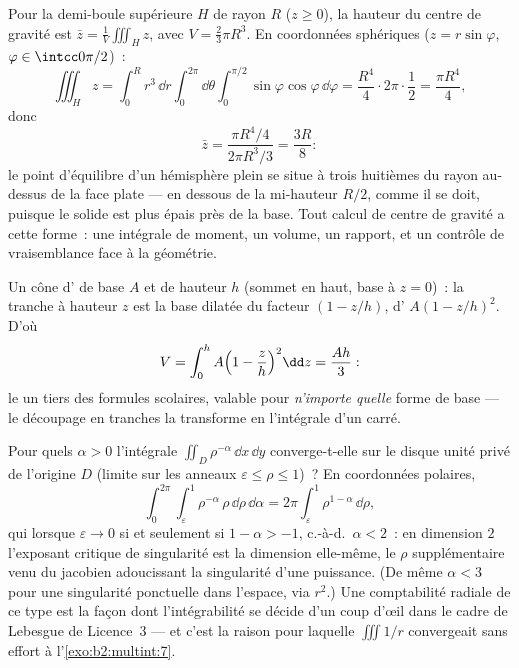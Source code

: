 \begin{example}\label{ex:b2:multint:centroid}
Pour la demi-boule supérieure $H$ de rayon $R$ ($z \geq 0$), la
hauteur du centre de gravité est $\bar z = \frac1{V}\iiint_H z$, avec
$V = \frac23\pi R^3$. En coordonnées sphériques ($z =
r\sin\varphi$, $\varphi \in \intcc0{\pi/2}$)~:
\[
\iiint_H z
= \int_0^R r^3\,\dd r\int_0^{2\pi}\dd\theta
\int_0^{\pi/2}\sin\varphi\cos\varphi\,\dd\varphi
= \frac{R^4}4\cdot2\pi\cdot\frac12 = \frac{\pi R^4}4 ,
\]
donc
\[
\bar z = \frac{\pi R^4/4}{2\pi R^3/3} = \frac{3R}8 :
\]
le point d'équilibre d'un hémisphère plein se situe à trois huitièmes
du rayon au-dessus de la face plate --- en dessous de la mi-hauteur
$R/2$, comme il se doit, puisque le solide est plus épais près de la
base. Tout calcul de centre de gravité a cette forme~: une intégrale
de moment, un volume, un rapport, et un contrôle de vraisemblance
face à la géométrie.
\end{example}

\begin{example}\label{ex:b2:multint:cone}
Un cône d' de base $A$ et de hauteur $h$ (sommet en haut, base à $z = 0$)~:
la tranche à hauteur $z$ est la base dilatée du facteur $(1 -
z/h)$, d' $A(1 - z/h)^2$. D'où
\[
V = \int_0^h A\Bigl(1 - \frac zh\Bigr)^2\dd z = \frac{Ah}{3} :
\]
le un tiers des formules scolaires, valable pour \emph{n'importe quelle}
forme de base --- le découpage en tranches la transforme en l'intégrale
d'un carré.
\end{example}

\begin{example}\label{ex:b2:multint:threshold}
Pour quels $\alpha > 0$ l'intégrale $\iint_{D}\rho^{-\alpha}\,\dd
x\,\dd y$ converge-t-elle sur le disque unité privé de l'origine $D$
(limite sur les anneaux $\varepsilon \leq \rho \leq 1$)~? En
coordonnées polaires,
\[
\int_0^{2\pi}\!\!\int_\varepsilon^1\rho^{-\alpha}\,
\rho\,\dd\rho\,\dd\alpha
= 2\pi\int_\varepsilon^1\rho^{1-\alpha}\,\dd\rho ,
\]
qui  lorsque $\varepsilon \to 0$ si et seulement si
$1 - \alpha > -1$, c.-à-d.\ $\alpha < 2$~: en dimension $2$ l'exposant
critique de singularité est la dimension elle-même, le $\rho$
supplémentaire venu du jacobien adoucissant la singularité d'une
puissance. (De même $\alpha < 3$ pour une singularité ponctuelle dans
l'espace, via $r^2$.) Une comptabilité radiale de ce type est la
façon dont l'intégrabilité se décide d'un coup d'œil dans le cadre
de Lebesgue de Licence~3 --- et c'est la raison pour laquelle
$\iiint 1/r$ convergeait sans effort à l'\cref{exo:b2:multint:7}.
\end{example}

